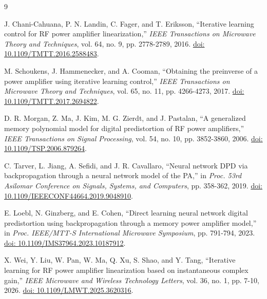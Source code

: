 \documentclass[10pt,a4paper]{article}
\begin{document}
\begin{thebibliography}{9}
\small
\raggedright

J. Chani-Cahuana, P. N. Landin, C. Fager, and T. Eriksson,
``Iterative learning control for RF power amplifier linearization,''
\emph{IEEE Transactions on Microwave Theory and Techniques}, vol. 64, no. 9,
pp. 2778-2789, 2016. \href{https://doi.org/10.1109/TMTT.2016.2588483}{doi: 10.1109/TMTT.2016.2588483}.

M. Schoukens, J. Hammenecker, and A. Cooman,
``Obtaining the preinverse of a power amplifier using iterative learning control,''
\emph{IEEE Transactions on Microwave Theory and Techniques}, vol. 65, no. 11,
pp. 4266-4273, 2017. \href{https://doi.org/10.1109/TMTT.2017.2694822}{doi: 10.1109/TMTT.2017.2694822}.

D. R. Morgan, Z. Ma, J. Kim, M. G. Zierdt, and J. Pastalan,
``A generalized memory polynomial model for digital predistortion of RF power amplifiers,''
\emph{IEEE Transactions on Signal Processing}, vol. 54, no. 10,
pp. 3852-3860, 2006. \href{https://doi.org/10.1109/TSP.2006.879264}{doi: 10.1109/TSP.2006.879264}.

C. Tarver, L. Jiang, A. Sefidi, and J. R. Cavallaro,
``Neural network DPD via backpropagation through a neural network model of the PA,''
in \emph{Proc. 53rd Asilomar Conference on Signals, Systems, and Computers},
pp. 358-362, 2019. \href{https://doi.org/10.1109/IEEECONF44664.2019.9048910}{doi: 10.1109/IEEECONF44664.2019.9048910}.

E. Loebl, N. Ginzberg, and E. Cohen,
``Direct learning neural network digital predistortion using backpropagation through a memory power amplifier model,''
in \emph{Proc. IEEE/MTT-S International Microwave Symposium},
pp. 791-794, 2023. \href{https://doi.org/10.1109/IMS37964.2023.10187912}{doi: 10.1109/IMS37964.2023.10187912}.

X. Wei, Y. Liu, W. Pan, W. Ma, Q. Xu, S. Shao, and Y. Tang,
``Iterative learning for RF power amplifier linearization based on instantaneous complex gain,''
\emph{IEEE Microwave and Wireless Technology Letters}, vol. 36, no. 1,
pp. 7-10, 2026. \href{https://doi.org/10.1109/LMWT.2025.3620316}{doi: 10.1109/LMWT.2025.3620316}.

\end{thebibliography}
\end{document}
